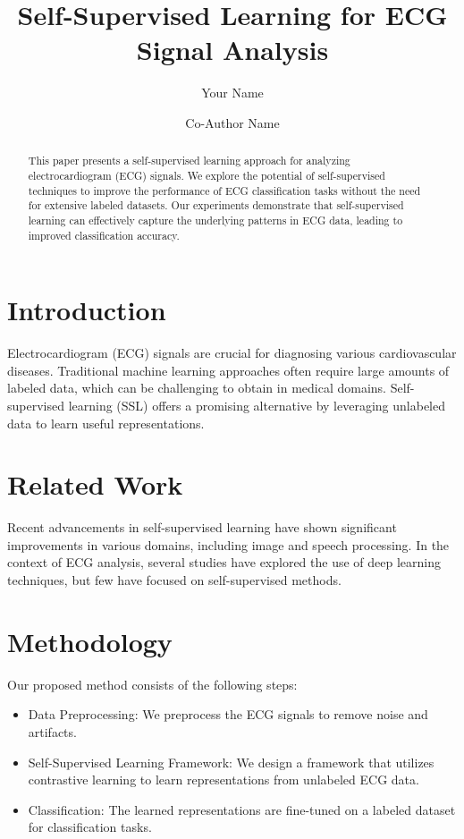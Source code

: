 \documentclass[sigconf]{acmart}
\title{Self-Supervised Learning for ECG Signal Analysis}
\author{Your Name}
\affiliation{%
  \institution{Your Institution}
  \city{Your City}
  \country{Your Country}
}
\author{Co-Author Name}
\affiliation{%
  \institution{Co-Author Institution}
  \city{Co-Author City}
  \country{Co-Author Country}
}
\begin{document}
\begin{abstract}
  This paper presents a self-supervised learning approach for analyzing electrocardiogram (ECG) signals. We explore the potential of self-supervised techniques to improve the performance of ECG classification tasks without the need for extensive labeled datasets. Our experiments demonstrate that self-supervised learning can effectively capture the underlying patterns in ECG data, leading to improved classification accuracy.
\end{abstract}


\maketitle

\section{Introduction}
Electrocardiogram (ECG) signals are crucial for diagnosing various cardiovascular diseases. Traditional machine learning approaches often require large amounts of labeled data, which can be challenging to obtain in medical domains. Self-supervised learning (SSL) offers a promising alternative by leveraging unlabeled data to learn useful representations.

\section{Related Work}
Recent advancements in self-supervised learning have shown significant improvements in various domains, including image and speech processing. In the context of ECG analysis, several studies have explored the use of deep learning techniques, but few have focused on self-supervised methods.

\section{Methodology}
Our proposed method consists of the following steps:
\begin{itemize}
    \item Data Preprocessing: We preprocess the ECG signals to remove noise and artifacts.
    \item Self-Supervised Learning Framework: We design a framework that utilizes contrastive learning to learn representations from unlabeled ECG data.
    \item Classification: The learned representations are fine-tuned on a labeled dataset for classification tasks.
\end{itemize}
\end{document}
